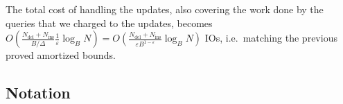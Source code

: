 \documentclass[11pt]{article}
\newcommand{\Ni}{N_{\mathrm{ins}}}
\newcommand{\Nd}{N_{\mathrm{del}}}
\begin{document}
The total cost of handling the updates, also covering the work done by
the queries that we charged to the updates, becomes
$O(\frac{\Nd+\Ni}{B/\Delta}\frac{1}{\varepsilon}\log_B
N)=O(\frac{\Nd+\Ni} {\varepsilon B^{1-\varepsilon}}\log_B N)$ IOs,
i.e.\ matching the previous proved amortized bounds.




\newpage

\begin{appendix}
	
\section{Notation}


\end{appendix}
\end{document}
